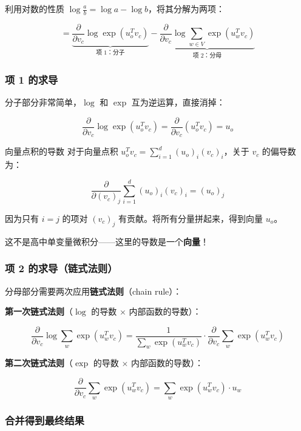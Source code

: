 \documentclass[a4paper]{article}
\begin{document}
利用对数的性质 $\log \frac{a}{b} = \log a - \log b$，将其分解为两项：

$$= \underbrace{\frac{\partial}{\partial v_c} \log \exp(u_o^T v_c)}_{\text{项 1：分子}} - \underbrace{\frac{\partial}{\partial v_c} \log \sum_{w \in V} \exp(u_w^T v_c)}_{\text{项 2：分母}}$$





\subsubsection{项 1 的求导}

分子部分非常简单，$\log$ 和 $\exp$ 互为逆运算，直接消掉：

$$\frac{\partial}{\partial v_c} \log \exp(u_o^T v_c) = \frac{\partial}{\partial v_c} (u_o^T v_c) = u_o$$

\begin{knowledgebox}{向量点积的导数}
对于向量点积 $u_o^T v_c = \sum_{i=1}^{d} (u_o)_i (v_c)_i$，关于 $v_c$ 的偏导数为：

$$\frac{\partial}{\partial (v_c)_j} \sum_{i=1}^{d} (u_o)_i (v_c)_i = (u_o)_j$$

因为只有 $i = j$ 的项对 $(v_c)_j$ 有贡献。将所有分量拼起来，得到向量 $u_o$。

这不是高中单变量微积分——这里的导数是一个\textbf{向量}！
\end{knowledgebox}

\subsubsection{项 2 的求导（链式法则）}

分母部分需要两次应用\textbf{链式法则}（chain rule）：

\textbf{第一次链式法则}（$\log$ 的导数 $\times$ 内部函数的导数）：

$$\frac{\partial}{\partial v_c} \log \sum_{w} \exp(u_w^T v_c) = \frac{1}{\sum_{w} \exp(u_w^T v_c)} \cdot \frac{\partial}{\partial v_c} \sum_{w} \exp(u_w^T v_c)$$

\textbf{第二次链式法则}（$\exp$ 的导数 $\times$ 内部函数的导数）：

$$\frac{\partial}{\partial v_c} \sum_{w} \exp(u_w^T v_c) = \sum_{w} \exp(u_w^T v_c) \cdot u_w$$

\subsubsection{合并得到最终结果}
\end{document}
